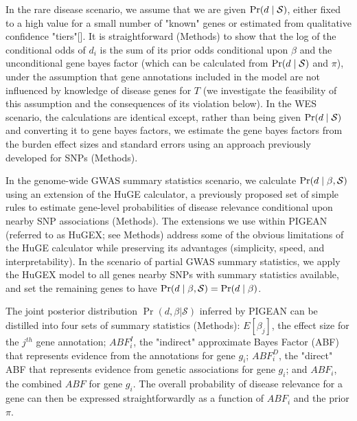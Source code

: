 In the rare disease scenario, we assume that we are given $\text{Pr}(d \mid \mathcal{S})$, either fixed to a high value for a small number of "known" genes or estimated from qualitative confidence "tiers"[].  It is straightforward (Methods) to show that the log of the conditional odds of $d_i$ is the sum of its prior odds conditional upon $\beta$ and the unconditional gene bayes factor (which can be calculated from $\text{Pr}(d \mid \mathcal{S})$ and $\pi$), under the assumption that gene annotations included in the model are not influenced by knowledge of disease genes for $T$ (we investigate the feasibility of this assumption and the consequences of its violation below). In the WES scenario, the calculations are identical except, rather than being given $\text{Pr}(d \mid \mathcal{S})$ and converting it to gene bayes factors, we estimate the gene bayes factors from the burden effect sizes and standard errors using an approach previously developed for SNPs (Methods).

In the genome-wide GWAS summary statistics scenario, we calculate $\text{Pr}(d \mid \beta, \mathcal{S})$ using an extension of the HuGE calculator, a previously proposed set of simple rules to estimate gene-level probabilities of disease relevance conditional upon nearby SNP associations (Methods). The extensions we use within PIGEAN (referred to as HuGEX; see Methods) address some of the obvious limitations of the HuGE calculator while preserving its advantages (simplicity, speed, and interpretability). In the  scenario of partial GWAS summary statistics, we apply the HuGEX model to all genes nearby SNPs with summary statistics available, and set the remaining genes to have $\text{Pr}(d \mid \beta, \mathcal{S})=\text{Pr}(d \mid \beta)$. 

The joint posterior distribution $\Pr(d,\beta|\mathcal{S})$ inferred by PIGEAN can be distilled into four sets of summary statistics (Methods): $E[\beta_j]$, the effect size for the $j^{th}$  gene annotation; $ABF^I_i$, the "indirect" approximate Bayes Factor (ABF) that represents evidence from the annotations for gene $g_i$; $ABF^D_i$, the "direct" ABF that represents evidence from genetic associations for gene $g_i$; and $ABF_i$, the combined $ABF$ for gene $g_i$. The overall probability of disease relevance for a gene can then be expressed straightforwardly as a function of $ABF_i$ and the prior $\pi$. 

